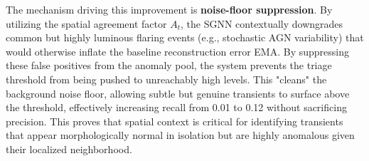 \documentclass[10pt,journal,compsoc]{IEEEtran}
\begin{document}
The mechanism driving this improvement is \textbf{noise-floor suppression}. By utilizing the spatial agreement factor $A_t$, the SGNN contextually downgrades common but highly luminous flaring events (e.g., stochastic AGN variability) that would otherwise inflate the baseline reconstruction error EMA. By suppressing these false positives from the anomaly pool, the system prevents the triage threshold from being pushed to unreachably high levels. This "cleans" the background noise floor, allowing subtle but genuine transients to surface above the threshold, effectively increasing recall from 0.01 to 0.12 without sacrificing precision. This proves that spatial context is critical for identifying transients that appear morphologically normal in isolation but are highly anomalous given their localized neighborhood.

\begin{figure}[htbp]
    \centering
\end{figure}
\end{document}
